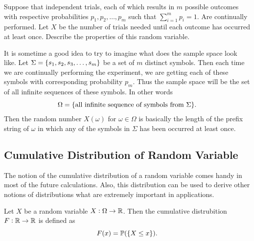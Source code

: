 \begin{example}
	Suppose that independent trials, each of which results in $m$ possible outcomes with respective probabilities $p_1, p_2, \hdots,p_m$ such that $\sum_{i=1}^{m}p_i = 1$. Are continually performed. Let $X$ be the number of trials needed until each outcome has occurred at least once. Describe the properties of this random variable.
	\begin{solution}
		It is sometime a good idea to try to imagine what does the sample space look like. Let $\Sigma=\{s_1, s_2, s_3, \hdots, s_m\}$ be a set of $m$ distinct symbols. Then each time we are continually performing the experiment, we are getting each of these symbols with corresponding probability $p_m$. Thus the sample space will be the set of all infinite sequences of these symbols. In other words
		\[ \Omega = \{\text{all infinite sequence of symbols from $\Sigma$}\}. \]
		Then the random number $X(\omega)$ for $\omega \in \Omega$ is basically the length of the prefix string of $\omega$ in which any of the symbols in $\Sigma$ has been occurred at least once. 
	\end{solution}
\end{example}



\subsection{Cumulative Distribution of Random Variable}
The notion of the cumulative distribution of a random variable comes handy in most of the future calculations. Also, this distribution can be used to derive other notions of distributions what are extremely important in applications. 

\begin{definition}
	Let $X$ be a random variable $X:\Omega \to \mathbb{R}$. Then the cumulative distrubition $F: \mathbb{R} \to \mathbb{R}$ is defined as
	\[ F(x) = \mathbb{P}(\{X \leq x\}).  \]
\end{definition}

